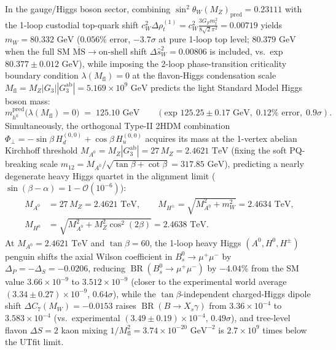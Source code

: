\documentclass[11pt,a4paper]{article}
\theoremstyle{definition}
\theoremstyle{remark}
\newcommand{\Gthree}{G_3}
\begin{document}
In the gauge/Higgs boson sector, combining $\sin^2\theta_W(M_Z)_{\mathrm{pred}} = 0.23111$ with the 1-loop custodial top-quark shift $c_W^2\Delta\rho_t^{(1)} = c_W^2\frac{3 G_F m_t^2}{8\sqrt{2}\pi^2} = 0.00719$ yields $m_W = 80.332\text{ GeV}$ ($0.056\%$ error, $-3.7\sigma$ at pure 1-loop top level; $80.379\text{ GeV}$ when the full SM $\overline{\mathrm{MS}}\to\text{on-shell}$ shift $\Delta\hat{s}_W^2 = 0.00806$ is included, vs.\ exp $80.377 \pm 0.012\text{ GeV}$), while imposing the 2-loop phase-transition criticality boundary condition $\lambda(M_{\mathrm{fl}}) = 0$ at the flavon-Higgs condensation scale $M_{\mathrm{fl}} = M_Z |\Gthree| |\Gthree^{\mathrm{ab}}| = 5.169 \times 10^9\text{ GeV}$ predicts the light Standard Model Higgs boson mass:
\begin{equation}
m_{h^0}^{\mathrm{pred}}\bigl(\lambda(M_{\mathrm{fl}}) = 0\bigr) \;=\; 125.10\text{ GeV} \qquad (\text{exp } 125.25 \pm 0.17\text{ GeV},\; 0.12\%\text{ error},\; 0.9\sigma).
\end{equation}
Simultaneously, the orthogonal Type-II 2HDM combination $\Phi_\perp = -\sin\beta\,H_d^{(0,0)} + \cos\beta\,H_u^{(0,0)}$ acquires its mass at the 1-vertex abelian Kirchhoff threshold $M_{A^0} = M_Z |\Gthree^{\mathrm{ab}}| = 27\,M_Z = 2.4621\text{ TeV}$ (fixing the soft PQ-breaking scale $m_{12} = M_{A^0}/\sqrt{\tan\beta + \cot\beta} = 317.85\text{ GeV}$), predicting a nearly degenerate heavy Higgs quartet in the alignment limit ($\sin(\beta-\alpha) = 1 - \mathcal{O}(10^{-6})$):
\begin{equation}
\label{eq:heavy_2hdm}
\begin{aligned}
M_{A^0} &= 27\,M_Z = 2.4621\text{ TeV}, \qquad
M_{H^\pm} = \sqrt{M_{A^0}^2 + m_W^2} = 2.4634\text{ TeV}, \\
M_{H^0} &= \sqrt{M_{A^0}^2 + M_Z^2 \cos^2(2\beta)} = 2.4638\text{ TeV}.
\end{aligned}
\end{equation}
At $M_{A^0} = 2.4621\text{ TeV}$ and $\tan\beta = 60$, the 1-loop heavy Higgs $(A^0, H^0, H^\pm)$ penguin shifts the axial Wilson coefficient in $B_s^0 \to \mu^+\mu^-$ by $\Delta_P = -\Delta_S = -0.0206$, reducing $\operatorname{BR}(B_s^0 \to \mu^+\mu^-)$ by $-4.04\%$ from the SM value $3.66 \times 10^{-9}$ to $3.512 \times 10^{-9}$ (closer to the experimental world average $(3.34 \pm 0.27) \times 10^{-9}$, $0.64\sigma$), while the $\tan\beta$-independent charged-Higgs dipole shift $\Delta C_7(M_W) = -0.0153$ raises $\operatorname{BR}(B \to X_s \gamma)$ from $3.36 \times 10^{-4}$ to $3.583 \times 10^{-4}$ (vs.\ experimental $(3.49 \pm 0.19) \times 10^{-4}$, $0.49\sigma$), and tree-level flavon $\Delta S = 2$ kaon mixing $1/M_{\mathrm{fl}}^2 = 3.74 \times 10^{-20}\text{ GeV}^{-2}$ is $2.7 \times 10^9$ times below the UTfit limit.
\end{document}
